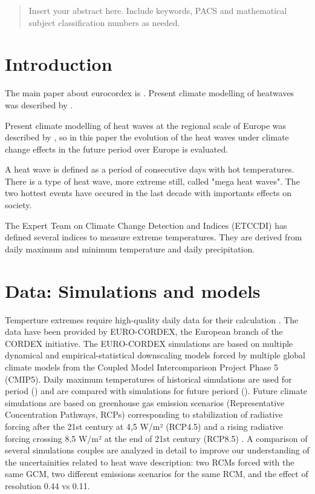 \date{Received: date / Accepted: date}


\maketitle

\begin{abstract}
Insert your abstract here. Include keywords, PACS and mathematical
subject classification numbers as needed.
\end{abstract}

\section{Introduction}
\label{introduction}
The main paper about eurocordex is \cite{jac_al2014}. Present climate
modelling of heatwaves was described by \cite{vau_al2013}.

Present climate modelling of heat waves at the regional scale of Europe was described by \cite{vau_al2013}, so in this paper the evolution of the heat waves under climate change effects in the future period over Europe is evaluated.

A heat wave is defined as a period of consecutive days with hot temperatures. There is a type of heat wave, more extreme still, called "mega heat waves". The two hottest events have occured in the last decade \cite{bar_al2011} with importants effects on society. 

The Expert Team on Climate Change Detection and Indices (ETCCDI) has defined several indices to measure extreme temperatures. They are derived from daily maximum and minimum temperature and daily precipitation.   

\section{Data: Simulations and models}

Temperture extremes require high-quality daily data for their calculation \cite{per_2015}. The data have been provided by EURO-CORDEX, the European branch of the CORDEX initiative. The EURO-CORDEX simulations are based on multiple dynamical and empirical-statistical downscaling models forced by multiple global climate models from the Coupled Model Intercomparison Project Phase 5 (CMIP5). Daily maximum temperatures of historical simulations are used for period () and are compared with simulations for future periord (). Future climate simulations are based on greenhouse gas emission scenarios (Representative Concentration Pathways, RCPs) corresponding to stabilization of radiative forcing after the 21st century at 4,5 W/m² (RCP4.5) and a rising radiative forcing crossing 8,5 W/m² at the end of 21st century (RCP8.5) \cite{Mos_al2010}. 
A comparison of several simulations couples are analyzed in detail to improve our understanding of the uncertainities related to heat wave description: two RCMs forced with the same GCM, two different emissions scenarios for the same RCM, and the effect of resolution 0.44 vs 0.11. 


